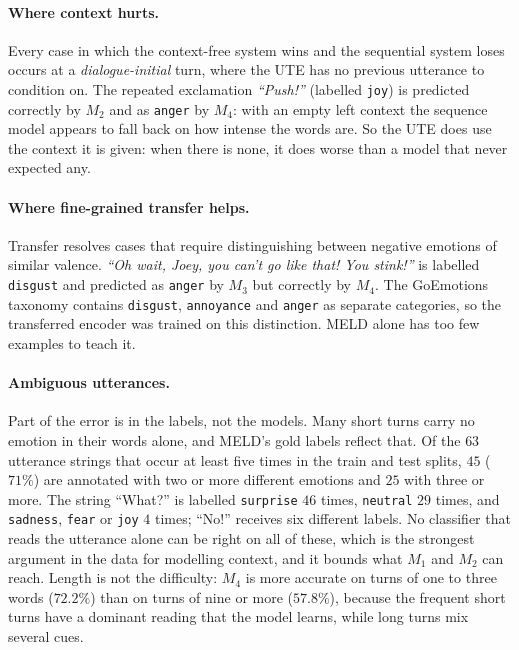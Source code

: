\documentclass[sigconf,nonacm]{acmart}
\begin{document}
\paragraph{Where context hurts.}
Every case in which the context-free system wins and the sequential system loses occurs at a
\emph{dialogue-initial} turn, where the UTE has no previous utterance to condition on. The
repeated exclamation \emph{``Push!''} (labelled \texttt{joy}) is predicted correctly by
$M_2$ and as \texttt{anger} by $M_4$: with an empty left context the sequence model appears
to fall back on how intense the words are. So the UTE does use the context it is given:
when there is none, it does worse than a model that never expected any.

\paragraph{Where fine-grained transfer helps.}
Transfer resolves cases that require distinguishing between negative emotions of similar
valence. \emph{``Oh wait, Joey, you can't go like that! You stink!''} is labelled
\texttt{disgust} and predicted as \texttt{anger} by $M_3$ but correctly by $M_4$. The
GoEmotions taxonomy contains \texttt{disgust}, \texttt{annoyance} and \texttt{anger} as
separate categories, so the transferred encoder was trained on this distinction. MELD
alone has too few examples to teach it.

\paragraph{Ambiguous utterances.}
Part of the error is in the labels, not the models. Many short turns carry no emotion in
their words alone, and MELD's gold labels reflect that. Of the $63$ utterance strings that
occur at least five times in the train and test splits, $45$ ($71\%$) are annotated with
two or more different emotions and $25$ with three or more. The string ``What?'' is labelled
\texttt{surprise} $46$ times, \texttt{neutral} $29$ times, and \texttt{sadness},
\texttt{fear} or \texttt{joy} $4$ times; ``No!'' receives six different labels. No
classifier that reads the utterance alone can be right on all of these, which is the
strongest argument in the data for modelling context, and it bounds what $M_1$ and $M_2$
can reach. Length is not the difficulty: $M_4$ is more accurate on turns of one to three
words ($72.2\%$) than on turns of nine or more ($57.8\%$), because the frequent short
turns have a dominant reading that the model learns, while long turns mix several cues.
\end{document}
